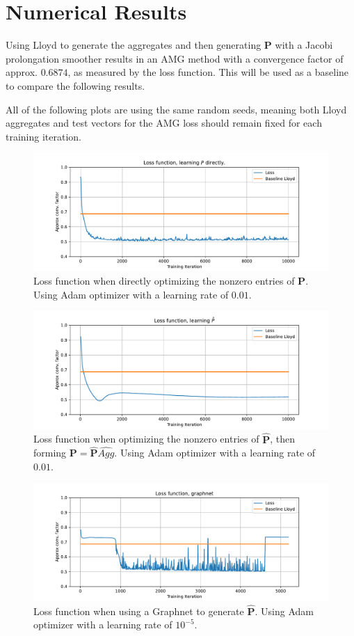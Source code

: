 \documentclass{article}
\newcommand{\mat}[1]{\bm{{#1}}}
\begin{document}
\section{Numerical Results}
Using Lloyd to generate the aggregates and then generating $\mat{P}$ with a Jacobi prolongation smoother results in an AMG method with a convergence factor of approx. $0.6874$, as measured by the loss function.  This will be used as a baseline to compare the following results.

All of the following plots are using the same random seeds, meaning both Lloyd aggregates and test vectors for the AMG loss should remain fixed for each training iteration.

\begin{figure}[h]
  \includegraphics[width=\textwidth]{figures/learn_p_directly.pdf}
  \caption{Loss function when directly optimizing the nonzero entries of $\mat{P}$.  Using Adam optimizer with a learning rate of $0.01$.}
  \label{fig:loss_p}
\end{figure}

\begin{figure}[h]
  \includegraphics[width=\textwidth]{figures/learn_p_hat.pdf}
  \caption{Loss function when optimizing the nonzero entries of $\mat{\hat{P}}$, then forming $\mat{P}=\mat{\hat{P}}\hat{Agg}$.  Using Adam optimizer with a learning rate of $0.01$.}
  \label{fig:loss_p_hat}
\end{figure}

\begin{figure}[h]
  \includegraphics[width=\textwidth]{figures/learn_graphnet.pdf}
  \caption{Loss function when using a Graphnet to generate $\mat{\hat{P}}$.  Using Adam optimizer with a learning rate of $10^{-5}$.}
  \label{fig:loss_graphnet}
\end{figure}
\end{document}
